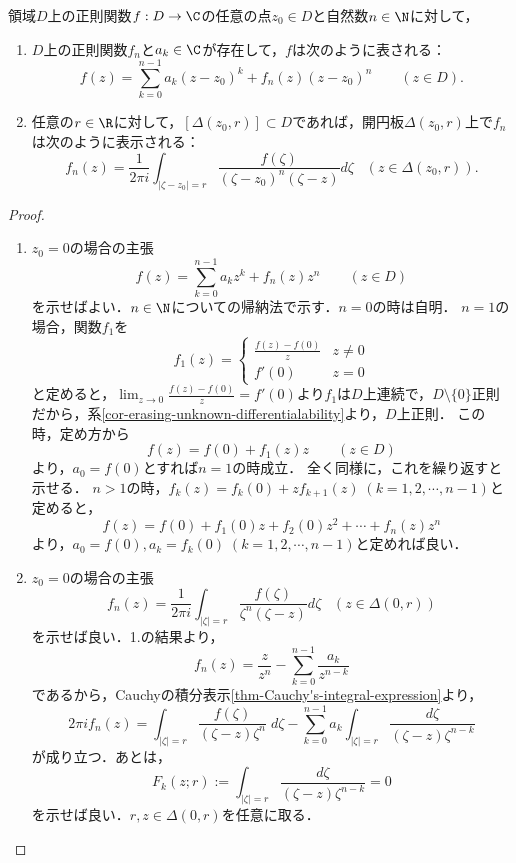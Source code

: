 \documentclass[uplatex, dvipdfmx]{jsreport}
\begin{document}
\begin{theorem}[Taylorの定理と剰余項の積分表示]\label{thm-Taylor}
    領域$D$上の正則関数$f:D\to\C$の任意の点$z_0\in D$と自然数$n\in\N$に対して，
    \begin{enumerate}
        \item $D$上の正則関数$f_n$と$a_k\in\C$が存在して，$f$は次のように表される：
        \[ f(z)=\sum^{n-1}_{k=0}a_k(z-z_0)^k+f_n(z)(z-z_0)^n\qquad(z\in D). \]
        \item 任意の$r\in\R$に対して，$[\Delta(z_0,r)]\subset D$であれば，開円板$\Delta(z_0,r)$上で$f_n$は次のように表示される：
        \[ f_n(z)=\frac{1}{2\pi i}\int_{|\zeta-z_0|=r}\frac{f(\zeta)}{(\zeta-z_0)^n(\zeta-z)}d\zeta\;\;\;(z\in\Delta(z_0,r)). \]
    \end{enumerate}
\end{theorem}
\begin{proof}\mbox{}
    \begin{enumerate}
        \item 
    $z_0=0$の場合の主張
    \[f(z)=\sum^{n-1}_{k=0}a_kz^k+f_n(z)z^n\qquad(z\in D)\]
    を示せばよい．$n\in\N$についての帰納法で示す．$n=0$の時は自明．
    $n=1$の場合，関数$f_1$を
    \[f_1(z)=
        \begin{cases}
            \frac{f(z)-f(0)}{z}&z\ne 0\\
            f'(0)&z=0
        \end{cases}
    \]
    と定めると，$\lim_{z\to 0}\frac{f(z)-f(0)}{z}=f'(0)$より$f_1$は$D$上連続で，$D\setminus\{0\}$正則だから，系\ref{cor-erasing-unknown-differentialability}より，$D$上正則．
    この時，定め方から
    \[f(z)=f(0)+f_1(z)z\qquad(z\in D)\]
    より，$a_0=f(0)$とすれば$n=1$の時成立．
    全く同様に，これを繰り返すと示せる．
    $n>1$の時，$f_k(z)=f_k(0)+zf_{k+1}(z)\;(k=1,2,\cdots,n-1)$と定めると，
    \[f(z)=f(0)+f_1(0)z+f_2(0)z^2+\cdots+f_n(z)z^n\]
    より，$a_0=f(0),a_k=f_k(0)\;(k=1,2,\cdots,n-1)$と定めれば良い．
    \item
    $z_0=0$の場合の主張
    \[f_n(z)=\frac{1}{2\pi i}\int_{|\zeta|=r}\frac{f(\zeta)}{\zeta^n(\zeta-z)}d\zeta\;\;\;(z\in\Delta(0,r))\]
    を示せば良い．1.の結果より，
    \[f_n(z)=\frac{z}{z^n}-\sum^{n-1}_{k=0}\frac{a_k}{z^{n-k}}\]
    であるから，Cauchyの積分表示\ref{thm-Cauchy's-integral-expression}より，
    \[2\pi if_n(z)=\int_{|\zeta|=r}\frac{f(\zeta)}{(\zeta-z)\zeta^n}\;d\zeta-\sum^{n-1}_{k=0}a_k\int_{|\zeta|=r}\frac{d\zeta}{(\zeta-z)\zeta^{n-k}}\]
    が成り立つ．あとは，
    \[F_k(z;r):=\int_{|\zeta|=r}\frac{d\zeta}{(\zeta-z)\zeta^{n-k}}=0\]
    を示せば良い．$r,z\in\Delta(0,r)$を任意に取る．

\end{enumerate}
\end{proof}
\end{document}

